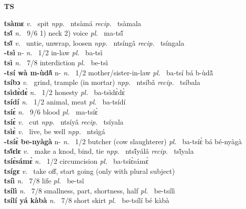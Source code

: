 \medskip
\noindent \large {\bfseries TS}\normalsize\\
\medskip

\noindent
{\bfseries tsàmɛ}  {\itshape v.~} spit   {\itshape npp.~} ntsàmá {\itshape recip.~} tsàmala  \\ 
{\bfseries tsĩ́}  {\itshape n.~} 9/6 1) neck 2) voice {\itshape pl.~} ma-tsĩ́    \\ 
{\bfseries tsĩ̂}  {\itshape v.~} untie, unwrap, loosen   {\itshape npp.~} ntsíngâ {\itshape recip.~} tsíngala \\ 
{\bfseries -tsì} n- {\itshape n.~} 1/2 in-law {\itshape pl.~} ba-tsì    \\ 
{\bfseries tsì}  {\itshape n.~} 7/8 interdiction {\itshape pl.~} be-tsì    \\ 
{\bfseries -tsí wà m-ùdã̂} n- {\itshape n.~} 1/2 mother/sister-in-law {\itshape pl.~} ba-tsí bá b-ùdã̂    \\ 
{\bfseries tsíbɔ}  {\itshape v.~} grind, trample (in mortar)   {\itshape npp.~} ntsíbâ {\itshape recip.~} tsíbala  \\ 
{\bfseries tsìdɛ̀dɛ̀}  {\itshape n.~} 1/2 honesty {\itshape pl.~} ba-tsìdɛ̀dɛ̀    \\ 
{\bfseries tsídí}  {\itshape n.~} 1/2 animal, meat {\itshape pl.~} ba-tsídí    \\ 
{\bfseries tsíɛ̀}  {\itshape n.~} 9/6 blood {\itshape pl.~} ma-tsíɛ̀    \\ 
{\bfseries tsíɛ̀}  {\itshape v.~} cut   {\itshape npp.~} ntsíyâ {\itshape recip.~} tsíyala  \\ 
{\bfseries tsìɛ̀}  {\itshape v.~} live, be well   {\itshape npp.~} ntsìgá  \\ 
{\bfseries -tsíɛ̀ be-nyàgà} n- {\itshape n.~} 1/2 butcher (cow slaughterer) {\itshape pl.~} ba-tsíɛ̀ bá bé-nyàgà    \\ 
{\bfseries tsĩ́ɛlɛ}  {\itshape v.~} make a knod, bind, tie   {\itshape npp.~} ntsĩ́yálâ {\itshape recip.~} tsĩ́yala  \\ 
{\bfseries tsíɛ̀sámɛ̀}  {\itshape n.~} 1/2 circumcision {\itshape pl.~} ba-tsíɛ̀sámɛ̀    \\ 
{\bfseries tsígɛ}  {\itshape v.~} take off, start going (only with plural subject)    \\ 
{\bfseries tsíì}  {\itshape n.~} 7/8 life {\itshape pl.~} be-tsî    \\ 
{\bfseries tsílì}  {\itshape n.~} 7/8 smallness, part, shortness, half {\itshape pl.~} be-tsílì    \\ 
{\bfseries tsílí yá kàbà}  {\itshape n.~} 7/8 short skirt {\itshape pl.~} be-tsílí bé kàbà    \\ 
